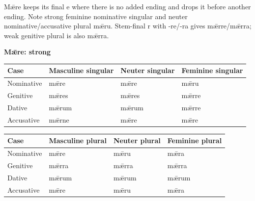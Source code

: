 Mǣre keeps its final e where there is no added ending and drops it before another ending. Note strong feminine nominative singular and neuter nominative/\allowbreak{}accusative plural mǣru. Stem-final r with -re/\allowbreak{}-ra gives mǣrre/\allowbreak{}mǣrra; weak genitive plural is also mǣrra.

\textbf{Mǣre: strong}

\par\begingroup
\fontsize{10.5}{13.2}\selectfont
\setlength{\LTleft}{0pt}\setlength{\LTright}{\fill}
\noindent
\begin{tabular}{@{}>{\raggedright\arraybackslash}p{22.0mm}>{\raggedright\arraybackslash}p{31.188mm}>{\raggedright\arraybackslash}p{31.188mm}>{\raggedright\arraybackslash}p{31.188mm}@{}}
\toprule
\textbf{Case} & \textbf{Masculine singular} & \textbf{Neuter singular} & \textbf{Feminine singular} \\
\midrule
Nominative & mǣre & mǣre & mǣru \\
Genitive & mǣres & mǣres & mǣrre \\
Dative & mǣrum & mǣrum & mǣrre \\
Accusative & mǣrne & mǣre & mǣre \\
\bottomrule
\end{tabular}
\par\endgroup
\par\addvspace{5pt}
\par\begingroup
\fontsize{10.5}{13.2}\selectfont
\setlength{\LTleft}{0pt}\setlength{\LTright}{\fill}
\noindent
\begin{tabular}{@{}>{\raggedright\arraybackslash}p{22.0mm}>{\raggedright\arraybackslash}p{31.188mm}>{\raggedright\arraybackslash}p{31.188mm}>{\raggedright\arraybackslash}p{31.188mm}@{}}
\toprule
\textbf{Case} & \textbf{Masculine plural} & \textbf{Neuter plural} & \textbf{Feminine plural} \\
\midrule
Nominative & mǣre & mǣru & mǣra \\
Genitive & mǣrra & mǣrra & mǣrra \\
Dative & mǣrum & mǣrum & mǣrum \\
Accusative & mǣre & mǣru & mǣra \\
\bottomrule
\end{tabular}
\par\endgroup

